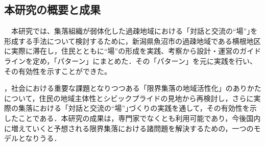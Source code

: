 \documentclass[a4paper]{jsarticle}
\begin{document}
\subsection{本研究の概要と成果}
　本研究では、集落組織が弱体化した過疎地域における「対話と交流の“場”｣を形成する手法について検討するために，新潟県魚沼市の過疎地域である横根地区に実際に滞在し，住民とともに“場”の形成を実践、考察から設計・運営のガイドラインを定め，「パターン」にまとめた．その「パターン」を元に実践を行い、その有効性を示すことができた。



，社会における重要な課題となりつつある「限界集落の地域活性化」のありかたについて，住民の地域主体性とシビックプライドの見地から再検討し，さらに実際の集落における「対話と交流の“場”｣づくりの実践を通して，その有効性を示したことである．本研究の成果は，専門家でなくとも利用可能であり，今後国内に増えていくと予想される限界集落における諸問題を解決するための，一つのモデルとなりうる．
\newpage
\end{document}
